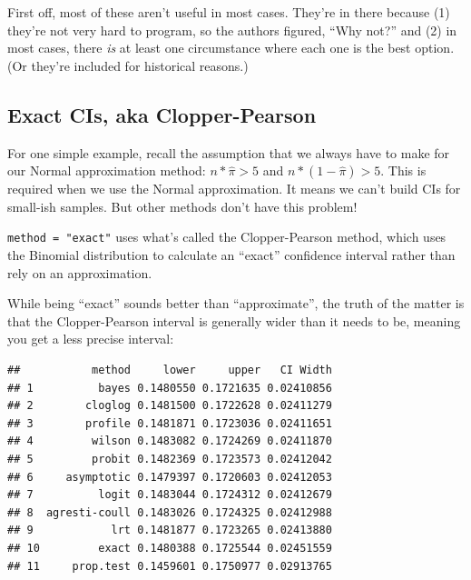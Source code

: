 \documentclass[
]{book}
\newenvironment{Shaded}{\begin{snugshade}}{\end{snugshade}}
\newcommand{\DataTypeTok}[1]{\textcolor[rgb]{0.13,0.29,0.53}{#1}}
\newcommand{\DecValTok}[1]{\textcolor[rgb]{0.00,0.00,0.81}{#1}}
\newcommand{\FloatTok}[1]{\textcolor[rgb]{0.00,0.00,0.81}{#1}}
\newcommand{\KeywordTok}[1]{\textcolor[rgb]{0.13,0.29,0.53}{\textbf{#1}}}
\newcommand{\NormalTok}[1]{#1}
\newcommand{\OperatorTok}[1]{\textcolor[rgb]{0.81,0.36,0.00}{\textbf{#1}}}
\newcommand{\StringTok}[1]{\textcolor[rgb]{0.31,0.60,0.02}{#1}}
\theoremstyle{definition}
\theoremstyle{definition}
\theoremstyle{definition}
\theoremstyle{remark}
\begin{document}
First off, most of these aren't useful in most cases. They're in there because (1) they're not very hard to program, so the authors figured, ``Why not?'' and (2) in most cases, there \emph{is} at least one circumstance where each one is the best option. (Or they're included for historical reasons.)

\hypertarget{exact-cis-aka-clopper-pearson}{%
\subsection{Exact CIs, aka Clopper-Pearson}\label{exact-cis-aka-clopper-pearson}}

For one simple example, recall the assumption that we always have to make for our Normal approximation method: \(n * \hat\pi > 5\) and \(n * (1 - \hat\pi) > 5\). This is required when we use the Normal approximation. It means we can't build CIs for small-ish samples. But other methods don't have this problem!

\texttt{method\ =\ "exact"} uses what's called the Clopper-Pearson method, which uses the Binomial distribution to calculate an ``exact'' confidence interval rather than rely on an approximation.

While being ``exact'' sounds better than ``approximate'', the truth of the matter is that the Clopper-Pearson interval is generally wider than it needs to be, meaning you get a less precise interval:

\begin{Shaded}
\end{Shaded}

\begin{verbatim}
##           method     lower     upper   CI Width
## 1          bayes 0.1480550 0.1721635 0.02410856
## 2        cloglog 0.1481500 0.1722628 0.02411279
## 3        profile 0.1481871 0.1723036 0.02411651
## 4         wilson 0.1483082 0.1724269 0.02411870
## 5         probit 0.1482369 0.1723573 0.02412042
## 6     asymptotic 0.1479397 0.1720603 0.02412053
## 7          logit 0.1483044 0.1724312 0.02412679
## 8  agresti-coull 0.1483026 0.1724325 0.02412988
## 9            lrt 0.1481877 0.1723265 0.02413880
## 10         exact 0.1480388 0.1725544 0.02451559
## 11     prop.test 0.1459601 0.1750977 0.02913765
\end{verbatim}
\end{document}
